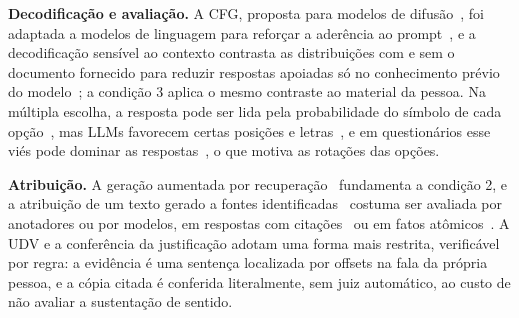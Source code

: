 \textbf{Decodificação e avaliação.} A CFG, proposta para modelos de difusão~\citep{ho2022classifier},
foi adaptada a modelos de linguagem para reforçar a aderência ao prompt~\citep{sanchez2024stay}, e a
decodificação sensível ao contexto contrasta as distribuições com e sem o documento fornecido para
reduzir respostas apoiadas só no conhecimento prévio do modelo~\citep{shi2024trusting}; a condição 3
aplica o mesmo contraste ao material da pessoa. Na múltipla escolha, a resposta pode ser lida pela
probabilidade do símbolo de cada opção~\citep{robinson2023leveraging}, mas LLMs favorecem certas
posições e letras~\citep{zheng2024large,pezeshkpour2024large}, e em questionários esse viés pode
dominar as respostas~\citep{dominguezolmedo2024questioning}, o que motiva as rotações das opções.

\textbf{Atribuição.} A geração aumentada por recuperação~\citep{lewis2020rag} fundamenta a condição 2,
e a atribuição de um texto gerado a fontes identificadas~\citep{rashkin2023measuring} costuma ser
avaliada por anotadores ou por modelos, em respostas com citações~\citep{gao2023enabling} ou em fatos
atômicos~\citep{min2023factscore}. A UDV e a conferência da justificação adotam uma forma mais
restrita, verificável por regra: a evidência é uma sentença localizada por offsets na fala da própria
pessoa, e a cópia citada é conferida literalmente, sem juiz automático, ao custo de não avaliar a
sustentação de sentido.
